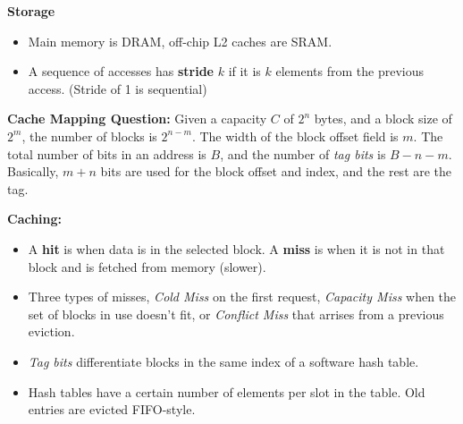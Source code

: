 \documentclass[titlepage, 12pt, leqno]{article}
\begin{document}
\begin{multicols*}{2}
\textbf{Storage}
\begin{itemize}
    \item Main memory is DRAM, off-chip L2 caches are SRAM.
    \item A sequence of accesses has \textbf{stride} $k$ if it is $k$ elements 
        from the previous access. (Stride of 1 is sequential)
\end{itemize}

\textbf{Cache Mapping Question:}
Given a capacity $C$ of $2^n$ bytes, and a block size of $2^m$, the number of 
blocks is $2^{n-m}$. The width of the block offset field is $m$. The total number of bits in an address is $B$, and the number of \textit{tag bits} is $B-n-m$.
Basically, $m+n$ bits are used for the block offset and index, and the rest are
the tag.

\pagebreak
\textbf{Caching:}
\begin{itemize}
    \item A \textbf{hit} is when data is in the selected block. A \textbf{miss} is
        when it is not in that block and is fetched from memory (slower).
    \item Three types of misses, \textit{Cold Miss} on the first request,
        \textit{Capacity Miss} when the set of blocks in use doesn't fit, or
        \textit{Conflict Miss} that arrises from a previous eviction.
    \item \textit{Tag bits} differentiate blocks in the same index of a software
        hash table.
    \item Hash tables have a certain number of elements per slot in the table.
        Old entries are evicted FIFO-style.
\end{itemize}


\end{multicols*}
\end{document}
